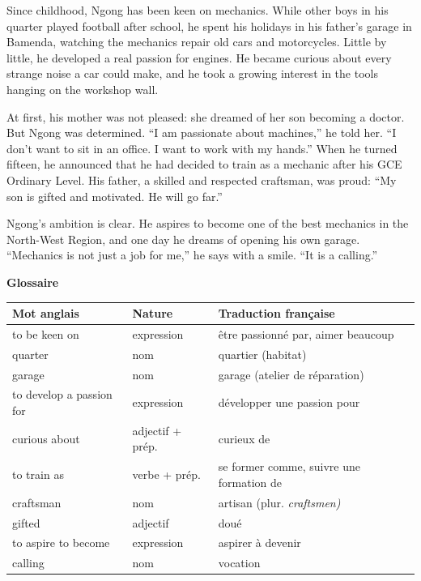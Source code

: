 \documentclass[11pt]{article}
\newcommand{\eng}[1]{\ifmmode\text{\textit{#1}}\else\begingroup\selectlanguage{english}\itshape #1\endgroup\fi}
\begin{document}
\begin{textebox}
Since childhood, Ngong has been keen on mechanics. While other boys in his quarter played football after school, he spent his holidays in his father's garage in Bamenda, watching the mechanics repair old cars and motorcycles. Little by little, he developed a real passion for engines. He became curious about every strange noise a car could make, and he took a growing interest in the tools hanging on the workshop wall.

At first, his mother was not pleased: she dreamed of her son becoming a doctor. But Ngong was determined. “I am passionate about machines,” he told her. “I don't want to sit in an office. I want to work with my hands.” When he turned fifteen, he announced that he had decided to train as a mechanic after his GCE Ordinary Level. His father, a skilled and respected craftsman, was proud: “My son is gifted and motivated. He will go far.”

Ngong's ambition is clear. He aspires to become one of the best mechanics in the North-West Region, and one day he dreams of opening his own garage. “Mechanics is not just a job for me,” he says with a smile. “It is a calling.”
\end{textebox}

\textbf{Glossaire}

\begin{center}
\begin{tabularx}{\linewidth}{|l|l|X|}
\hline
\rowcolor{popblueL} Mot anglais & Nature & Traduction française \\
\hline
to be keen on & expression & être passionné par, aimer beaucoup \\
\hline
quarter & nom & quartier (habitat) \\
\hline
garage & nom & garage (atelier de réparation) \\
\hline
to develop a passion for & expression & développer une passion pour \\
\hline
curious about & adjectif + prép. & curieux de \\
\hline
to train as & verbe + prép. & se former comme, suivre une formation de \\
\hline
craftsman & nom & artisan (plur. \eng{craftsmen}) \\
\hline
gifted & adjectif & doué \\
\hline
to aspire to become & expression & aspirer à devenir \\
\hline
calling & nom & vocation \\
\hline
\end{tabularx}
\end{center}
\end{document}
